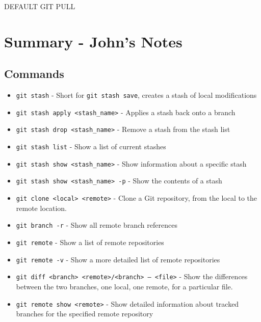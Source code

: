 DEFAULT GIT PULL


\clearpage

\section{Summary - John's Notes}
\subsection{Commands}
\begin{itemize}

\item\texttt{git stash} - Short for \texttt{git stash save}, creates a stash of local modifications

\item\texttt{git stash apply <stash\_name>} - Applies a stash back onto a branch

\item\texttt{git stash drop <stash\_name>} - Remove a stash from the stash list

\item\texttt{git stash list} - Show a list of current stashes

\item\texttt{git stash show <stash\_name>} - Show information about a specific stash

\item\texttt{git stash show <stash\_name> -p} - Show the contents of a stash

\item\texttt{git clone <local> <remote>} - Clone a Git repository, from the local to the remote location.

\item\texttt{git branch -r} - Show all remote branch references

\item\texttt{git remote} - Show a list of remote repositories

\item\texttt{git remote -v} - Show a more detailed list of remote repositories

\item\texttt{git diff <branch> <remote>/<branch> -- <file>} - Show the differences between the two branches, one local, one remote, for a particular file.

\item\texttt{git remote show <remote>} - Show detailed information about tracked branches for the specified remote repository


\end{itemize}
